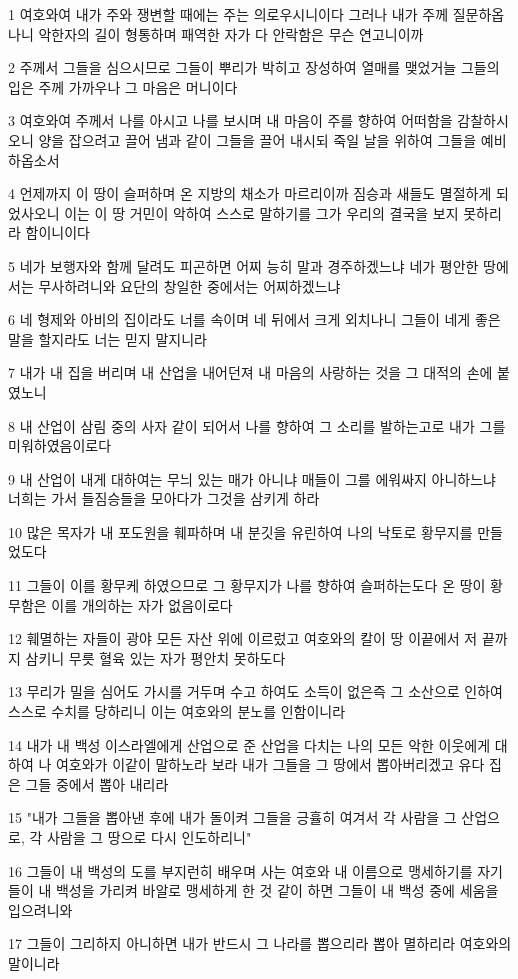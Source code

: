 \par 1 여호와여 내가 주와 쟁변할 때에는 주는 의로우시니이다 그러나 내가 주께 질문하옵나니 악한자의 길이 형통하며 패역한 자가 다 안락함은 무슨 연고니이까
\par 2 주께서 그들을 심으시므로 그들이 뿌리가 박히고 장성하여 열매를 맺었거늘 그들의 입은 주께 가까우나 그 마음은 머니이다
\par 3 여호와여 주께서 나를 아시고 나를 보시며 내 마음이 주를 향하여 어떠함을 감찰하시오니 양을 잡으려고 끌어 냄과 같이 그들을 끌어 내시되 죽일 날을 위하여 그들을 예비하옵소서
\par 4 언제까지 이 땅이 슬퍼하며 온 지방의 채소가 마르리이까 짐승과 새들도 멸절하게 되었사오니 이는 이 땅 거민이 악하여 스스로 말하기를 그가 우리의 결국을 보지 못하리라 함이니이다
\par 5 네가 보행자와 함께 달려도 피곤하면 어찌 능히 말과 경주하겠느냐 네가 평안한 땅에서는 무사하려니와 요단의 창일한 중에서는 어찌하겠느냐
\par 6 네 형제와 아비의 집이라도 너를 속이며 네 뒤에서 크게 외치나니 그들이 네게 좋은 말을 할지라도 너는 믿지 말지니라
\par 7 내가 내 집을 버리며 내 산업을 내어던져 내 마음의 사랑하는 것을 그 대적의 손에 붙였노니
\par 8 내 산업이 삼림 중의 사자 같이 되어서 나를 향하여 그 소리를 발하는고로 내가 그를 미워하였음이로다
\par 9 내 산업이 내게 대하여는 무늬 있는 매가 아니냐 매들이 그를 에워싸지 아니하느냐 너희는 가서 들짐승들을 모아다가 그것을 삼키게 하라
\par 10 많은 목자가 내 포도원을 훼파하며 내 분깃을 유린하여 나의 낙토로 황무지를 만들었도다
\par 11 그들이 이를 황무케 하였으므로 그 황무지가 나를 향하여 슬퍼하는도다 온 땅이 황무함은 이를 개의하는 자가 없음이로다
\par 12 훼멸하는 자들이 광야 모든 자산 위에 이르렀고 여호와의 칼이 땅 이끝에서 저 끝까지 삼키니 무릇 혈육 있는 자가 평안치 못하도다
\par 13 무리가 밀을 심어도 가시를 거두며 수고 하여도 소득이 없은즉 그 소산으로 인하여 스스로 수치를 당하리니 이는 여호와의 분노를 인함이니라
\par 14 내가 내 백성 이스라엘에게 산업으로 준 산업을 다치는 나의 모든 악한 이웃에게 대하여 나 여호와가 이같이 말하노라 보라 내가 그들을 그 땅에서 뽑아버리겠고 유다 집은 그들 중에서 뽑아 내리라
\par 15 "내가 그들을 뽑아낸 후에 내가 돌이켜 그들을 긍휼히 여겨서 각 사람을 그 산업으로, 각 사람을 그 땅으로 다시 인도하리니"
\par 16 그들이 내 백성의 도를 부지런히 배우며 사는 여호와 내 이름으로 맹세하기를 자기들이 내 백성을 가리켜 바알로 맹세하게 한 것 같이 하면 그들이 내 백성 중에 세움을 입으려니와
\par 17 그들이 그리하지 아니하면 내가 반드시 그 나라를 뽑으리라 뽑아 멸하리라 여호와의 말이니라

